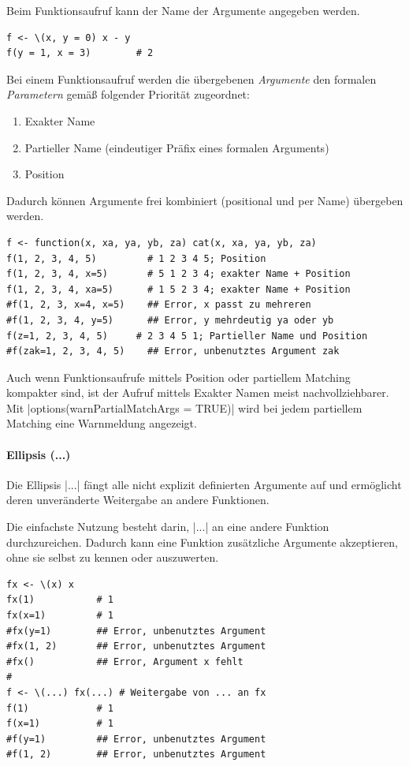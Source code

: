 \documentclass[10pt,twocolumn]{scrartcl}
\renewcommand{\lstinline}{\mycoloredinline}
\begin{document}
Beim Funktionsaufruf kann der Name der Argumente angegeben werden.

\begin{lstlisting}
f <- \(x, y = 0) x - y
f(y = 1, x = 3)        # 2
\end{lstlisting}

Bei einem Funktionsaufruf werden die übergebenen \emph{Argumente} den formalen \emph{Parametern} gemäß folgender Priorität zugeordnet:

\begin{enumerate}
  \item Exakter Name  
  \item Partieller Name (eindeutiger Präfix eines formalen Arguments)
  \item Position  
\end{enumerate}

Dadurch können Argumente frei kombiniert (positional und per Name) übergeben werden.

\begin{lstlisting}
f <- function(x, xa, ya, yb, za) cat(x, xa, ya, yb, za)
f(1, 2, 3, 4, 5)         # 1 2 3 4 5; Position
f(1, 2, 3, 4, x=5)       # 5 1 2 3 4; exakter Name + Position
f(1, 2, 3, 4, xa=5)      # 1 5 2 3 4; exakter Name + Position
#f(1, 2, 3, x=4, x=5)    ## Error, x passt zu mehreren
#f(1, 2, 3, 4, y=5)      ## Error, y mehrdeutig ya oder yb
f(z=1, 2, 3, 4, 5)     # 2 3 4 5 1; Partieller Name und Position
#f(zak=1, 2, 3, 4, 5)    ## Error, unbenutztes Argument zak
\end{lstlisting}

Auch wenn Funktionsaufrufe mittels Position oder partiellem Matching kompakter sind, ist der Aufruf mittels Exakter Namen meist nachvollziehbarer. Mit \lstinline|options(warnPartialMatchArgs = TRUE)| wird bei jedem partiellem Matching eine Warnmeldung angezeigt.

\paragraph{Ellipsis (...)}

Die Ellipsis \lstinline|...| fängt alle nicht explizit definierten Argumente auf und ermöglicht deren unveränderte Weitergabe an andere Funktionen.

Die einfachste Nutzung besteht darin, \lstinline|...| an eine andere Funktion
durchzureichen. Dadurch kann eine Funktion zusätzliche Argumente akzeptieren,
ohne sie selbst zu kennen oder auszuwerten.

\begin{lstlisting}
fx <- \(x) x
fx(1)           # 1
fx(x=1)         # 1
#fx(y=1)        ## Error, unbenutztes Argument
#fx(1, 2)       ## Error, unbenutztes Argument
#fx()           ## Error, Argument x fehlt
#
f <- \(...) fx(...) # Weitergabe von ... an fx
f(1)            # 1
f(x=1)          # 1
#f(y=1)         ## Error, unbenutztes Argument
#f(1, 2)        ## Error, unbenutztes Argument
\end{lstlisting}
\end{document}
